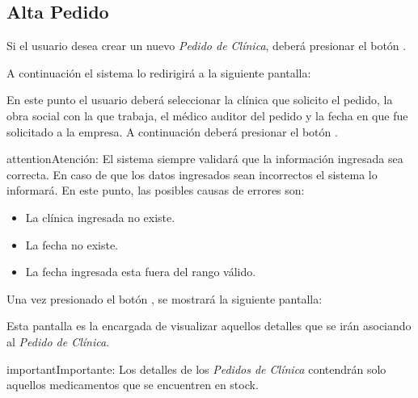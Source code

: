 \documentclass[a4paper,10pt,spanish]{sphinxmanual}
\begin{document}
\subsection{Alta Pedido}
\label{pedidosclinica:alta-pedido}\label{pedidosclinica:alta-pc}
Si el usuario desea crear un nuevo \emph{Pedido de Clínica}, deberá presionar el botón .


A continuación el sistema lo redirigirá a la siguiente pantalla:


En este punto el usuario deberá seleccionar la clínica que solicito el pedido, la obra social con la que trabaja, el médico auditor del pedido y la fecha en que fue solicitado a la empresa. A continuación deberá presionar el botón .

\begin{notice}{attention}{Atención:}
El sistema siempre validará que la información ingresada sea correcta. En caso de que los datos ingresados sean incorrectos el sistema lo informará.
En este punto, las posibles causas de errores son:
\begin{itemize}
\item {} 
La clínica ingresada no existe.

\item {} 
La fecha no existe.

\item {} 
La fecha ingresada esta fuera del rango válido.

\end{itemize}
\end{notice}

Una vez presionado el botón , se mostrará la siguiente pantalla:


Esta pantalla es la encargada de visualizar aquellos detalles que se irán asociando al \emph{Pedido de Clínica}.

\begin{notice}{important}{Importante:}
Los detalles de los \emph{Pedidos de Clínica} contendrán solo aquellos medicamentos que se encuentren en stock.
\end{notice}
\end{document}
